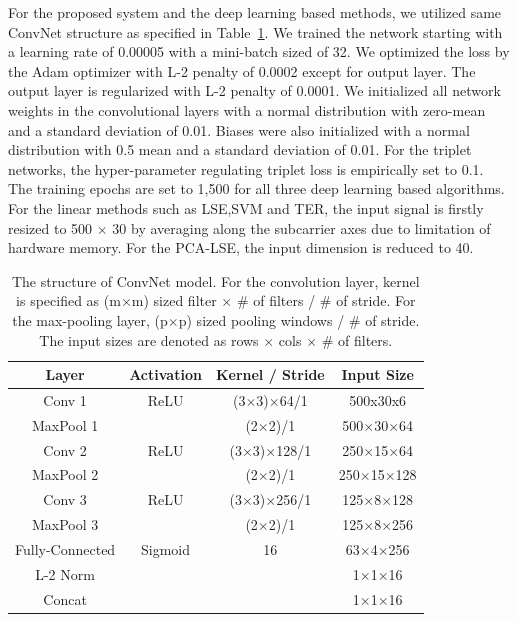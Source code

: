\documentclass[runningheads]{llncs}
\begin{document}
For the proposed system and the deep learning based methods, we utilized same ConvNet structure as specified in Table~\ref{tab1}. We trained the network starting with a learning rate of 0.00005 with a mini-batch sized of 32. We optimized the loss by the Adam optimizer with L-2 penalty of 0.0002 except for output layer. The output layer is regularized with L-2 penalty of 0.0001. We initialized all network weights in the convolutional layers with a normal distribution with zero-mean and a standard deviation of 0.01. Biases were also initialized with a normal distribution with 0.5 mean and a standard deviation of 0.01. For the triplet networks, the hyper-parameter regulating triplet loss is empirically set to 0.1. The training epochs are set to 1,500 for all three deep learning based algorithms. For the linear methods such as LSE,SVM and TER, the input signal is firstly resized to 500 $\times$ 30 by averaging along the subcarrier axes due to limitation of hardware memory. For the PCA-LSE, the input dimension is reduced to 40.
 
 \begin{table}[]
    \caption{
        The structure of ConvNet model. For the convolution layer, kernel is specified as (m$\times$m) sized filter $\times$ \# of filters / \# of stride. For the max-pooling layer, (p$\times$p) sized pooling windows / \# of stride. The input sizes are denoted as rows $\times$ cols $\times$ \# of filters. 
    }\label{tab1}
    \centering
    \begin{tabular}{|c|c|c|c|}
    \hline
    Layer     & Activation & Kernel / Stride & Input Size \\ \hline
    Conv 1    & ReLU       & (3$\times$3)$\times$64/1      & 500x30x6   \\
    MaxPool 1 &            & (2$\times$2)/1         & 500$\times$30$\times$64  \\
    Conv 2    & ReLU       & (3$\times$3)$\times$128/1     & 250$\times$15$\times$64 \\
    MaxPool 2 &            & (2$\times$2)/1         & 250$\times$15$\times$128 \\
    Conv 3    & ReLU       & (3$\times$3)$\times$256/1     & 125$\times$8$\times$128  \\
    MaxPool 3 &            & (2$\times$2)/1         & 125$\times$8$\times$256  \\
    Fully-Connected     & Sigmoid    & 16             & 63$\times$4$\times$256   \\
    L-2 Norm  &            &                 & 1$\times$1$\times$16    \\
    Concat    &            &                 & 1$\times$1$\times$16    \\ \hline
    \end{tabular}
\end{table}
\end{document}
